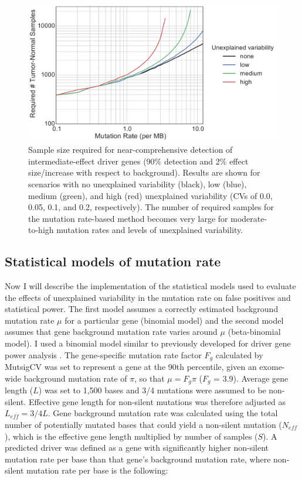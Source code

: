 \begin{figure}
  \centering
  \makeatletter
  \let\@currsize\normalsize
  \includegraphics[width=0.9\linewidth]{figures/chapter2/statistical_power.pdf}
  \caption[Sample size required for near-comprehensive detection of driver genes]{Sample size required for near-comprehensive detection of intermediate-effect driver genes (90\% detection and 2\% effect size/increase with respect to background). Results are shown for scenarios with no unexplained variability (black), low (blue), medium (green), and high (red) unexplained variability (CVs of 0.0, 0.05, 0.1, and 0.2, respectively). The number of required samples for the mutation rate-based method becomes very large for moderate-to-high mutation rates and levels of unexplained variability.}
  \label{fig:statistical_power}
\end{figure}

\subsection{Statistical models of mutation rate}

Now I will describe the implementation of the statistical models used to evaluate the effects of unexplained variability in the mutation rate on false positives and statistical power. The first model assumes a correctly estimated background mutation rate $\mu$ for a particular gene (binomial model) and the second model assumes that gene background mutation rate varies around $\mu$ (beta-binomial model). I used a binomial model similar to previously developed for driver gene power analysis \cite{RN14}. The gene-specific mutation rate factor $F_g$ calculated by MutsigCV \cite{RN14} was set to represent a gene at the 90th percentile, given an exome-wide background mutation rate of $\pi$, so that $\mu=F_g\pi$ ($F_g$ = 3.9). Average gene length ($L$) was set to 1,500 bases and 3/4 mutations were assumed to be non-silent. Effective gene length for non-silent mutations was therefore adjusted as $L_{eff}=3/4L$. Gene background mutation rate was calculated using the total number of potentially mutated bases that could yield a non-silent mutation ($N_{eff}$), which is the effective gene length multiplied by number of samples ($S$). A predicted driver was defined as a gene with significantly higher non-silent mutation rate per base than that gene's background mutation rate, where non-silent mutation rate per base is the following:

